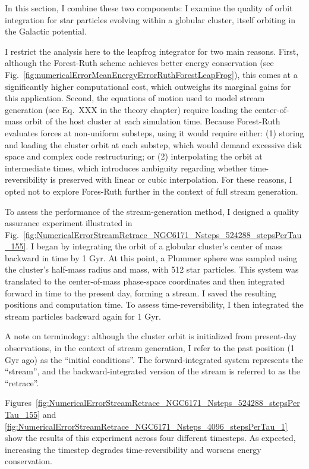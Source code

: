         In this section, I combine these two components: I examine the quality of orbit integration for star particles evolving within a globular cluster, itself orbiting in the Galactic potential.


        I restrict the analysis here to the leapfrog integrator for two main reasons. First, although the Forest-Ruth scheme achieves better energy conservation (see Fig.~\ref{fig:numericalErrorMeanEnergyErrorRuthForestLeapFrog}), this comes at a significantly higher computational cost, which outweighs its marginal gains for this application. Second, the equations of motion used to model stream generation (see Eq.~XXX in the theory chapter) require loading the center-of-mass orbit of the host cluster at each simulation time. Because Forest-Ruth evaluates forces at non-uniform substeps, using it would require either: (1) storing and loading the cluster orbit at each substep, which would demand excessive disk space and complex code restructuring; or (2) interpolating the orbit at intermediate times, which introduces ambiguity regarding whether time-reversibility is preserved with linear or cubic interpolation. For these reasons, I opted not to explore Fores-Ruth further in the context of full stream generation.

        To assess the performance of the stream-generation method, I designed a quality assurance experiment illustrated in Fig.~\ref{fig:NumericalErrorStreamRetrace_NGC6171_Nsteps_524288_stepsPerTau_155}. I began by integrating the orbit of a globular cluster's center of mass backward in time by 1 Gyr. At this point, a Plummer sphere was sampled using the cluster's half-mass radius and mass, with 512 star particles. This system was translated to the center-of-mass phase-space coordinates and then integrated forward in time to the present day, forming a stream. I saved the resulting positions and computation time. To assess time-reversibility, I then integrated the stream particles backward again for 1 Gyr.

        A note on terminology: although the cluster orbit is initialized from present-day observations, in the context of stream generation, I refer to the past position (1 Gyr ago) as the ``initial conditions''. The forward-integrated system represents the ``stream'', and the backward-integrated version of the stream is referred to as the ``retrace''.

        Figures~\ref{fig:NumericalErrorStreamRetrace_NGC6171_Nsteps_524288_stepsPerTau_155} and \ref{fig:NumericalErrorStreamRetrace_NGC6171_Nsteps_4096_stepsPerTau_1} show the results of this experiment across four different timesteps. As expected, increasing the timestep degrades time-reversibility and worsens energy conservation.

